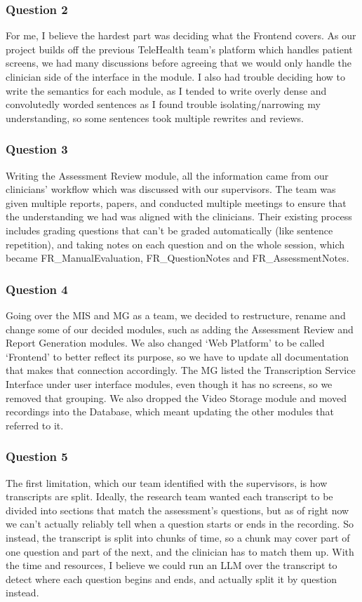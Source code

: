 \documentclass[12pt, titlepage]{article}
\begin{document}
\begin{enumerate}
\subsubsection*{Question 2}
For me, I believe the hardest part was deciding what the Frontend covers.
As our project builds off the previous TeleHealth team's platform which handles
patient screens, we had many discussions before agreeing that we would only
handle the clinician side of the interface in the module.
I also had trouble deciding how to write the semantics for each module, as I
tended to write overly dense and convolutedly worded sentences as I found trouble
isolating/narrowing my understanding, so some sentences took multiple rewrites and
reviews.

\subsubsection*{Question 3}
Writing the Assessment Review module, all the information came from our clinicians' workflow
which was discussed with our supervisors. The team was given multiple reports, papers,
and conducted multiple meetings to ensure that the understanding we had was aligned
with the clinicians.
Their existing process includes grading questions that can't be graded automatically 
(like sentence repetition), and taking notes on each question and on the whole session, 
which became FR\_ManualEvaluation, FR\_QuestionNotes and FR\_AssessmentNotes. 

\subsubsection*{Question 4}
Going over the MIS and MG as a team, we decided to restructure, rename and change some of
our decided modules, such as adding the Assessment Review and Report Generation modules.
We also changed `Web Platform' to be called `Frontend' to better reflect its purpose, so we have
to update all documentation that makes that connection accordingly.
The MG listed the Transcription Service Interface under user interface modules, even 
though it has no screens, so we removed that grouping. We also dropped the Video Storage module 
and moved recordings into the Database, which meant updating the other modules that referred to it. 

\subsubsection*{Question 5}
The first limitation, which our team identified with the supervisors, is how transcripts are split. 
Ideally, the research team wanted each transcript to be divided into sections that 
match the assessment's questions, but as of right now we can't actually reliably tell
when a question starts or ends in the recording. 
So instead, the transcript is split into chunks of time, so a chunk may cover part of 
one question and part of the next, and the clinician has to match them up. 
With the time and resources, I believe we could run an LLM over the transcript 
to detect where each question begins and ends, and actually split it by question instead. 


\end{enumerate}
\end{document}

